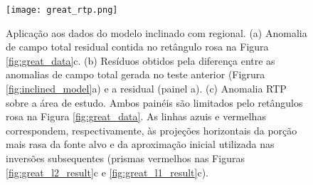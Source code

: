 \pagebreak

\begin{figure}[!htb]
	\centering
	\texttt{[image: great\_rtp.png]}
	\caption{Aplicação aos dados do modelo inclinado com regional. 
		(a) Anomalia de campo total residual contida no retângulo rosa na Figura \ref{fig:great_data}c. (b) Resíduos obtidos pela diferença entre as anomalias de campo total gerada no teste anterior (Figrura \ref{fig:inclined_model}a) e a residual (painel a). (c) Anomalia RTP sobre a área de estudo. Ambos painéis são limitados pelo retângulos rosa na Figura \ref{fig:great_data}. As linhas azuis e vermelhas correspondem, respectivamente, às projeções horizontais da porção mais rasa da fonte alvo e da aproximação inicial utilizada nas inversões subsequentes (prismas vermelhos nas Figuras \ref{fig:great_l2_result}c e 
		\ref{fig:great_l1_result}c).
	}
	\label{fig:great_model_rtp}
\end{figure}

\pagebreak


